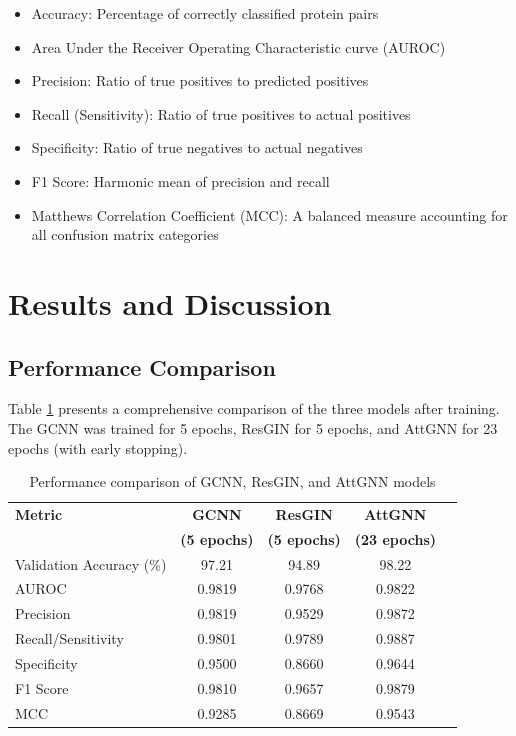 \documentclass[conference]{IEEEtran}
\begin{document}
\begin{itemize}
    \item Accuracy: Percentage of correctly classified protein pairs
    \item Area Under the Receiver Operating Characteristic curve (AUROC)
    \item Precision: Ratio of true positives to predicted positives
    \item Recall (Sensitivity): Ratio of true positives to actual positives
    \item Specificity: Ratio of true negatives to actual negatives
    \item F1 Score: Harmonic mean of precision and recall
    \item Matthews Correlation Coefficient (MCC): A balanced measure accounting for all confusion matrix categories
\end{itemize}

\section{Results and Discussion}

\subsection{Performance Comparison}
Table \ref{tab:model_comparison} presents a comprehensive comparison of the three models after training. The GCNN was trained for 5 epochs, ResGIN for 5 epochs, and AttGNN for 23 epochs (with early stopping).

\begin{table}[ht]
\centering
\caption{Performance comparison of GCNN, ResGIN, and AttGNN models}
\label{tab:model_comparison}
\begin{tabular}{lcccc}
\toprule
\textbf{Metric} & \textbf{GCNN} & \textbf{ResGIN} & \textbf{AttGNN} \\
 & \textbf{(5 epochs)} & \textbf{(5 epochs)} & \textbf{(23 epochs)} \\
\midrule
Validation Accuracy (\%) & 97.21 & 94.89 & 98.22 \\
AUROC & 0.9819 & 0.9768 & 0.9822 \\
Precision & 0.9819 & 0.9529 & 0.9872 \\
Recall/Sensitivity & 0.9801 & 0.9789 & 0.9887 \\
Specificity & 0.9500 & 0.8660 & 0.9644 \\
F1 Score & 0.9810 & 0.9657 & 0.9879 \\
MCC & 0.9285 & 0.8669 & 0.9543 \\
\bottomrule
\end{tabular}
\end{table}
\end{document}

